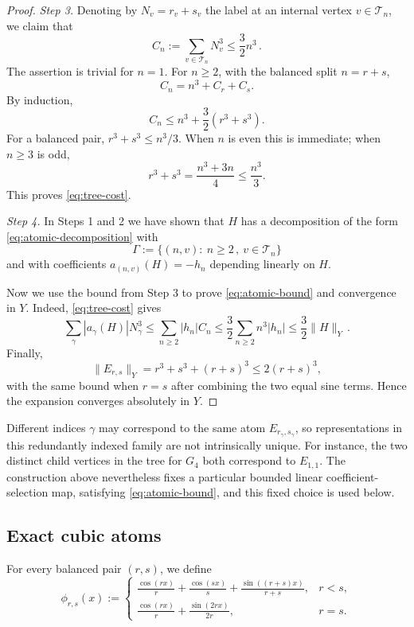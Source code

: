 \documentclass[11pt]{amsart}
\theoremstyle{definition}
\theoremstyle{remark}
\begin{document}
\begin{proof}
\medskip

\emph{Step 3.}
Denoting by $N_v=r_v+s_v$ the label at an internal vertex $v\in\mathcal T_n$, we claim that
\begin{equation}\label{eq:tree-cost}
 C_n:=\sum_{v\in\mathcal T_n}N_v^3 \leq\frac32n^3 \,.
\end{equation}
The assertion is trivial for $n=1$.  For $n\geq2$, with the balanced split $n=r+s$,
\[
 C_n=n^3+C_r+C_s.
\]
By induction,
\[
 C_n\leq n^3+\frac32(r^3+s^3).
\]
For a balanced pair, $r^3+s^3\leq n^3/3$.  When $n$ is even this is immediate; when $n\geq3$ is odd,
\[
 r^3+s^3=\frac{n^3+3n}{4}\leq\frac{n^3}{3}.
\]
This proves \eqref{eq:tree-cost}.

\medskip

\emph{Step 4.}
In Steps 1 and 2 we have shown that $H$ has a decomposition of the form \eqref{eq:atomic-decomposition} with 
$$
\Gamma:=\{ (n,v) :\ n\geq 2 \,,\ v\in\mathcal T_n \}
$$
and with coefficients $a_{(n,v)}(H)= - h_n$ depending linearly on $H$.

Now we use the bound from Step 3 to prove \eqref{eq:atomic-bound} and convergence in $Y$. Indeed, \eqref{eq:tree-cost} gives
\[
 \sum_\gamma|a_\gamma(H)|N_\gamma^3
 \leq\sum_{n\geq2}|h_n|C_n
 \leq\frac32\sum_{n\geq2}n^3|h_n| \leq \frac32 \|H\|_Y \,.
\]
Finally,
\begin{equation}
    \label{eq:normers}
    \|E_{r,s}\|_Y=r^3+s^3+(r+s)^3\leq2(r+s)^3,
\end{equation}
with the same bound when $r=s$ after combining the two equal sine terms.  Hence the expansion converges absolutely in $Y$.
\end{proof}

Different indices $\gamma$ may correspond to the same atom $E_{r_\gamma,s_\gamma}$, so representations in this redundantly indexed family are not intrinsically unique. For instance, the two distinct child vertices in the tree for $G_4$ both correspond to $E_{1,1}$. The construction above nevertheless fixes a particular bounded linear coefficient-selection map, satisfying \eqref{eq:atomic-bound}, and this fixed choice is used below.


\subsection{Exact cubic atoms}

For every balanced pair $(r,s)$, we define
\begin{equation}\label{eq:phi-rs}
 \phi_{r,s}(x):=
 \begin{cases}
 \displaystyle
 \frac{\cos(rx)}{r}+\frac{\cos(sx)}{s}
 +\frac{\sin((r+s)x)}{r+s},&r<s,\\[2.2ex]
 \displaystyle
 \frac{\cos(rx)}{r}+\frac{\sin(2rx)}{2r},&r=s.
 \end{cases}
\end{equation}
\end{document}
